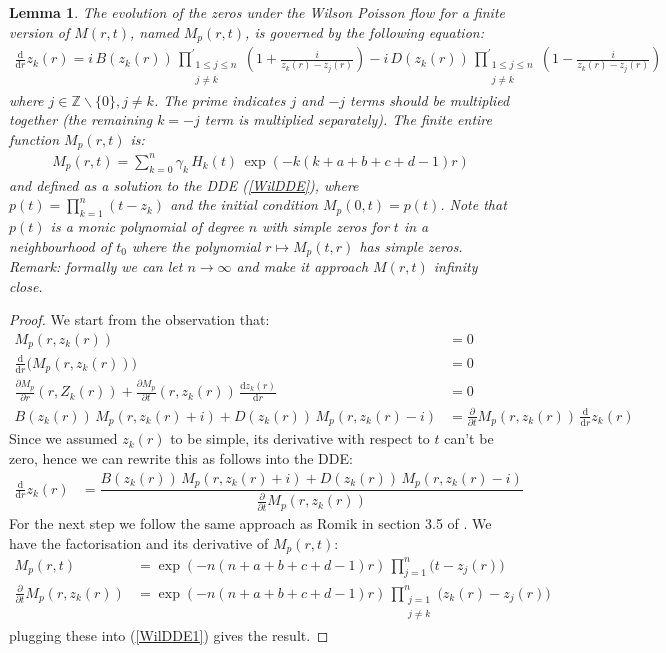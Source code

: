 \documentclass[a4paper,11pt,twoside]{amsart}
\newtheorem{lemma}[theorem]{Lemma}
\newcommand{\verifiedeq}{=}
\newcommand{\defeq}{=}
\newcommand{\verifiedeq}{\stackrel{\checkmark}{=}}
\newcommand{\defeq}{\stackrel{\scriptscriptstyle \textnormal{def}}{=}}
\begin{document}
\begin{lemma}\label{proofWil2} The evolution of the zeros under the Wilson Poisson flow for a finite version of $M(r,t)$, named $M_p(r,t)$, is governed by the following equation:
\begin{align}
 \frac{\mathrm{d}}{\mathrm{d} r}z_k(r) \verifiedeq i\,B(z_k(r))\, \prod^{'}_{\substack{1\le j \le n \\j \ne k}}\left(1+ \frac{i}{z_k(r)-z_j(r)}\right) -i\,D(z_k(r))\,\prod^{'}_{\substack{1\le j \le n \\j \ne k}} \left(1-\frac{i}{z_k(r)-z_j(r)}\right)
\end{align}
where $j \in \mathbb{Z}\backslash\{0\}, j \ne k$. The prime indicates $j$ and $-j$ terms should be multiplied together (the remaining $k=-j$ term is multiplied separately). The finite entire function $M_p(r,t)$ is:
\begin{align}
M_p(r,t) \verifiedeq \sum_{k=0}^n \gamma_k \, H_k(t)\,\exp(-k(k+a+b+c+d-1)r) 
\end{align}
and defined as a solution to the DDE (\ref{WilDDE}), where $p(t) \defeq \prod_{k=1}^n(t-z_k)$ and the initial condition $M_p(0,t) \defeq p(t)$. Note that $p(t)$ is a monic polynomial of degree $n$ with simple zeros for $t$ in a neighbourhood of $t_0$ where the polynomial $r \mapsto M_p(t,r)$ has simple zeros. Remark: formally we can let $n\to\infty$ and make it approach $M(r,t)$ infinity close.
\end{lemma}
\begin{proof}
We start from the observation that:
\begin{align}
M_p(r,z_k(r)) &\verifiedeq 0 \\
\frac{\mathrm{d}}{\mathrm{d} r} \big(M_p(r,z_k(r))\big) &\verifiedeq 0 \\
\frac{\partial M_p}{\partial r}(r,Z_k(r))+ \frac{\partial M_p}{\partial t}(r,z_k(r))\,\frac{\mathrm{d} z_k(r)}{\mathrm{d} r} &\verifiedeq 0 \\
B(z_k(r))\,M_p(r,z_k(r)+i) + D(z_k(r))\,M_p(r,z_k(r)-i)  &\verifiedeq \frac{\partial}{\partial t}M_p(r,z_k(r))\,\frac{\mathrm{d}}{\mathrm{d} r}z_k(r)
\end{align}
Since we assumed $z_k(r)$ to be simple, its derivative with respect to $t$ can't be zero, hence we can rewrite this as follows into the DDE:
\begin{align} \label{WilDDE1}
\frac{\mathrm{d} }{\mathrm{d} r}z_k(r) &\verifiedeq \dfrac{B(z_k(r))\,M_p(r,z_k(r)+i) + D(z_k(r))\,M_p(r,z_k(r)-i)}{ \frac{\partial}{\partial t}M_p(r,z_k(r))}
\end{align}
For the next step we follow the same approach as Romik in section 3.5 of \cite{rom}. We have the factorisation and its derivative of $M_p(r,t)$: 
\begin{align}
M_p(r,t) &\verifiedeq \exp(-n(n+a+b+c+d-1)r)\,\prod_{j=1}^n\bigg(t-z_j(r)\bigg)\\
\frac{\partial}{\partial t} M_p(r,z_k(r)) &\verifiedeq \exp\left(-n(n+a+b+c+d-1)r\right)\,\prod^n_{\substack{j=1\\j\ne k}}\bigg(z_k(r)-z_j(r)\bigg)
\end{align}
plugging these into (\ref{WilDDE1}) gives the result.
\end{proof}
\end{document}
